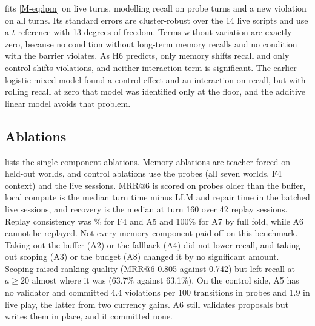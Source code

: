 \documentclass[letterpaper,journal,onecolumn]{IEEEtran}
\begin{document}
 fits \cref{M-eq:lpm} on live turns, modelling recall on probe turns and a new violation on all turns. Its standard errors are cluster-robust over the 14 live scripts and use a $t$ reference with 13 degrees of freedom. Terms without variation are exactly zero, because no condition without long-term memory recalls and no condition with the barrier violates. As H6 predicts, only memory shifts recall and only control shifts violations, and neither interaction term is significant. The earlier logistic mixed model found a control effect and an interaction on recall, but with rolling recall at zero that model was identified only at the floor, and the additive linear model avoids that problem.

\subsection{Ablations}\label{sec:ablations}

 lists the single-component ablations. Memory ablations are teacher-forced on held-out worlds, and control ablations use the probes (all seven worlds, F4 context) and the live sessions. MRR@6 is scored on probes older than the buffer, local compute is the median turn time minus LLM and repair time in the batched live sessions, and recovery is the median at turn 160 over 42 replay sessions. Replay consistency was \% for F4 and A5 and 100\% for A7 by full fold, while A6 cannot be replayed. Not every memory component paid off on this benchmark. Taking out the buffer (A2) or the fallback (A4) did not lower recall, and taking out scoping (A3) or the budget (A8) changed it by no significant amount. Scoping raised ranking quality (MRR@6 0.805 against 0.742) but left recall at $a\ge20$ almost where it was (63.7\% against 63.1\%). On the control side, A5 has no validator and committed 4.4 violations per 100 transitions in probes and 1.9 in live play, the latter from two currency gains. A6 still validates proposals but writes them in place, and it committed none.
\end{document}

